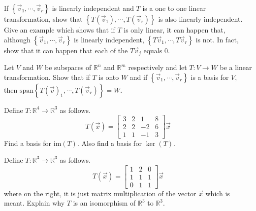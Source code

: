 \documentclass{ximera}
\begin{document}
\begin{problem}\label{prb:10.77} If $\left\{ \vec{v}_{1},\cdots ,\vec{v}_{r}\right\} $ is linearly
independent and $T$ is a one to one linear transformation, show that $
\left\{ T(\vec{v}_{1}),\cdots ,T(\vec{v}_{r})\right\} $ is also linearly
independent. Give an example which shows that if $T$ is only linear, it can
happen that, although $\left\{ \vec{v}_{1},\cdots ,\vec{v}_{r}\right\} $ is
linearly independent, $\left\{ T\vec{v}_{1},\cdots ,T\vec{v}_{r}\right\} $
is not. In fact, show that it can happen that each of the $T\vec{v}_{j}$
equals 0.
\end{problem}


\begin{problem}\label{prb:10.78} Let $V$ and $W$ be subspaces of $\mathbb{R}^{n}$ and $\mathbb{R}^{m}$
respectively and let $T:V\rightarrow W$ be a linear transformation. Show
that if $T$ is onto $W$ and if $\left\{ \vec{v}_{1},\cdots ,\vec{v}
_{r}\right\} $ is a basis for $V,$ then $\mbox{span}\left\{ T(\vec{v})
_{1},\cdots ,T(\vec{v}_{r})\right\} =W$.
\end{problem}


\begin{problem}\label{prb:10.79} Define $T:\mathbb{R}^{4}\rightarrow \mathbb{R}^{3}$ as follows.
\begin{equation*}
T(\vec{x})=\left[
\begin{array}{rrrr}
3 & 2 & 1 & 8 \\
2 & 2 & -2 & 6 \\
1 & 1 & -1 & 3
\end{array}
\right] \vec{x}
\end{equation*}
Find a basis for $\mbox{im}\left( T\right) $. Also find a basis for $\ker
\left( T\right) .$
\end{problem}


\begin{problem}\label{prb:10.80} Define $T:\mathbb{R}^{3}\rightarrow \mathbb{R}^{3}$ as follows.
\begin{equation*}
T(\vec{x})=\left[
\begin{array}{ccc}
1 & 2 & 0 \\
1 & 1 & 1 \\
0 & 1 & 1
\end{array}
\right] \vec{x}
\end{equation*}
where on the right, it is just matrix multiplication of the vector $\vec{x}$
which is meant. Explain why $T$ is an isomorphism of $\mathbb{R}^{3}$ to $
\mathbb{R}^{3}$.
\end{problem}
\end{document}
